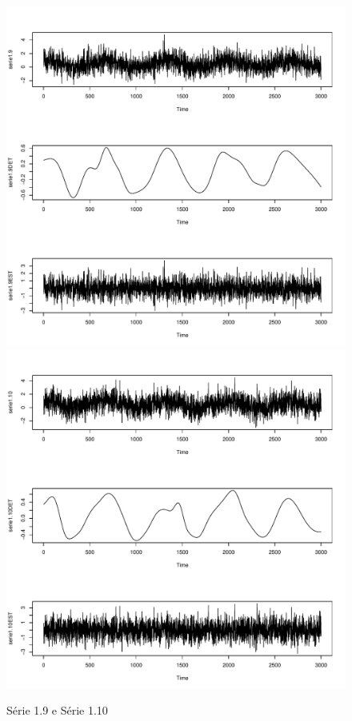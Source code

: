\graphicspath{{imagens/}}
\begin{figure}[H]
\begin{center}
  \includegraphics[scale=0.43]{serie1_9.pdf} \quad
  \includegraphics[scale=0.43]{serie1_10.pdf}
  \caption{Série 1.9 e Série 1.10}

\end{center}
\end{figure}

